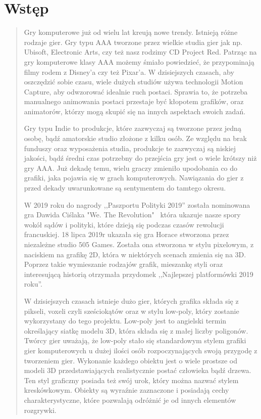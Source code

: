 \chapter*{Wstęp}
\begin{quotation}
\indent Gry komputerowe już od wielu lat kreują nowe trendy. Istnieją różne rodzaje gier.
Gry typu AAA tworzone przez wielkie studia gier jak np. Ubisoft, Electronic Arts, czy też nasz rodzimy CD Project Red. 
Patrząc na gry komputerowe klasy AAA możemy śmiało powiedzieć, że przypominają filmy rodem z Disney'a czy też Pixar'a. 
W dzisiejszych czasach, aby oszczędzić sobie czasu, wiele dużych studiów używa technologii Motion Capture, aby odwzorować idealnie ruch postaci. Sprawia to,
że potrzeba manualnego animowania postaci przestaje być kłopotem grafików, oraz animatorów, którzy mogą skupić się na innych aspektach swoich zadań.

\indent Gry typu Indie to produkcje, które zazwyczaj są tworzone przez jedną osobę, bądź amatorskie studio złożone z kilku osób. Ze względu na brak funduszy oraz wyposażenia studia, produkcje te zazwyczaj są niskiej jakości, bądź średni czas potrzebny do przejścia gry jest o wiele krótszy niż gry AAA. Już dekadę temu, wielu graczy zmieniło upodobania co do grafiki, jaka pojawia się w grach komputerowych. Nawiązania do gier z przed dekady uwarunkowane są sentymentem do tamtego okresu.

\indent W 2019 roku do nagrody ,,Paszportu Polityki 2019'' została nominowana gra Dawida Ciślaka "We. The Revolution" ~która ukazuje nasze spory wokół sądów i polityki, które dzieją się podczas czasów rewolucji francuskiej. 18 lipca 2019r ukazała się gra Horace stworzona przez niezależne studio 505 Games. Została ona stworzona w stylu pixelowym, z naciskiem na grafikę 2D, która w niektórych scenach zmienia się na 3D. Poprzez takie wymieszanie rodzajów grafik, mieszankę styli oraz interesującą historią otrzymała przydomek ,,Najlepszej platformówki 2019 roku''.

\indent W dzisiejszych czasach istnieje dużo gier, których grafika składa się z pikseli, voxeli czyli sześciokątów oraz w stylu low-poly, który zostanie wykorzystany do tego projektu.
\newpage
\indent Low-poly jest to angielski termin określający siatkę modelu 3D, która składa się z małej liczby poligonów. Twórcy gier uważają, że low-poly stało się standardowym stylem grafiki gier komputerowych u dużej ilości osób rozpoczynających swoją przygodę z tworzeniem gier. Wykonanie każdego obiektu jest o wiele prostsze od modeli 3D przedstawiających realistycznie postać człowieka bądź drzewa. Ten styl graficzny posiada też swój urok, który można nazwać stylem kreskówkowym. Obiekty są wyraźnie zaznaczone i posiadają cechy charakterystyczne, które pozwalają odróżnić je od innych elementów rozgrywki.

\newpage 
\end{quotation}

